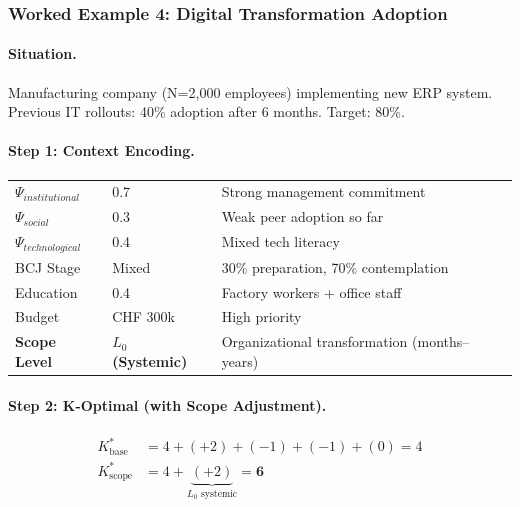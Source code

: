 
\subsubsection{Worked Example 4: Digital Transformation Adoption}
\label{subsubsec:example-org}

\paragraph{Situation.} Manufacturing company (N=2,000 employees) implementing new ERP system. Previous IT rollouts: 40\% adoption after 6 months. Target: 80\%.

\paragraph{Step 1: Context Encoding.}

\begin{center}
\begin{tabular}{@{}lll@{}}
\toprule
$\Psi_{institutional}$ & 0.7 & Strong management commitment \\
$\Psi_{social}$ & 0.3 & Weak peer adoption so far \\
$\Psi_{technological}$ & 0.4 & Mixed tech literacy \\
BCJ Stage & Mixed & 30\% preparation, 70\% contemplation \\
Education & 0.4 & Factory workers + office staff \\
Budget & CHF 300k & High priority \\
\textbf{Scope Level} & \textbf{$L_0$ (Systemic)} & Organizational transformation (months--years) \\
\bottomrule
\end{tabular}
\end{center}

\paragraph{Step 2: K-Optimal (with Scope Adjustment).}

\begin{align}
K^*_{\text{base}} &= 4 + (+2) + (-1) + (-1) + (0) = 4 \\
K^*_{\text{scope}} &= 4 + \underbrace{(+2)}_{L_0 \text{ systemic}} = \mathbf{6}
\end{align}

